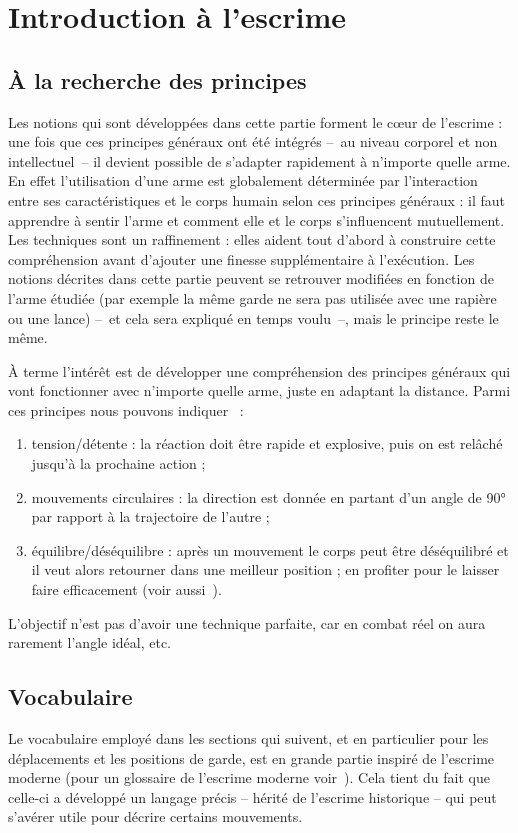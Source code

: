 \chapter{Introduction à l'escrime}


\section{À la recherche des principes}


Les notions qui sont développées dans cette partie forment le cœur de l'escrime : une fois que ces principes généraux ont été intégrés -- au niveau corporel et non intellectuel -- il devient possible de s'adapter rapidement à n'importe quelle arme.
En effet l'utilisation d'une arme est globalement déterminée par l'interaction entre ses caractéristiques et le corps humain selon ces principes généraux : il faut apprendre à sentir l'arme et comment elle et le corps s'influencent mutuellement.
Les techniques sont un raffinement : elles aident tout d'abord à construire cette compréhension avant d'ajouter une finesse supplémentaire à l'exécution.
Les notions décrites dans cette partie peuvent se retrouver modifiées en fonction de l'arme étudiée (par exemple la même garde ne sera pas utilisée avec une rapière ou une lance) -- et cela sera expliqué en temps voulu --, mais le principe reste le même.

À terme l'intérêt est de développer une compréhension des principes généraux qui vont fonctionner avec n'importe quelle arme, juste en adaptant la distance.
Parmi ces principes nous pouvons indiquer~\cite{enzi:dijon:messer_inner:2015} :
\begin{enumerate}
	\item tension/détente : la réaction doit être rapide et explosive, puis on est relâché jusqu'à la prochaine action ;
	\item mouvements circulaires : la direction est donnée en partant d'un angle de 90° par rapport à la trajectoire de l'autre ;
	\item équilibre/déséquilibre : après un mouvement le corps peut être déséquilibré et il veut alors retourner dans une meilleur position ; en profiter pour le laisser faire efficacement (voir aussi~\cite{guidoux:dijon:thibault:2015}).
\end{enumerate}
L'objectif n'est pas d'avoir une technique parfaite, car en combat réel on aura rarement l'angle idéal, etc.


\section{Vocabulaire}


Le vocabulaire employé dans les sections qui suivent, et en particulier pour les déplacements et les positions de garde, est en grande partie inspiré de l'escrime moderne (pour un glossaire de l'escrime moderne voir~\cite{FIE:2014:BrefsGlossairesLescrime}).
Cela tient du fait que celle-ci a développé un langage précis -- hérité de l'escrime historique -- qui peut s'avérer utile pour décrire certains mouvements.
